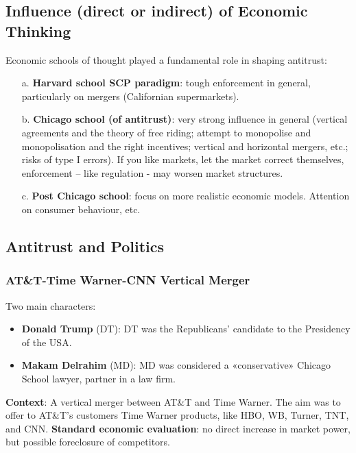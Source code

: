         
    \subsection{Influence (direct or indirect) of Economic Thinking}

        Economic schools of thought played a fundamental role in shaping antitrust: 
        \begin{itemize}
            \item[a.] \textbf{Harvard school SCP paradigm}: tough enforcement in general, particularly on mergers (Californian supermarkets).
            \item[b.] \textbf{Chicago school (of antitrust)}: very strong influence in general (vertical agreements and the theory of free riding;  attempt to monopolise and monopolisation and the right incentives; vertical and horizontal mergers, etc.; risks of type I errors). If you like markets, let the market correct themselves, enforcement – like regulation - may worsen market structures.
            \item[c.] \textbf{Post Chicago school}: focus on more realistic economic models. Attention on consumer behaviour, etc. 
        \end{itemize}


    \subsection{Antitrust and Politics}

        \subsubsection{AT\&T-Time Warner-CNN Vertical Merger}

            Two main characters:
                \begin{itemize}
                    \item \textbf{Donald Trump} (DT): DT was the Republicans’ candidate to the Presidency of the USA.
                    \item \textbf{Makam Delrahim} (MD): MD was considered a «conservative» Chicago School lawyer, partner in a law firm.  
                \end{itemize}

            \textbf{Context}: A vertical merger between AT\&T and Time Warner. The aim was to offer to AT\&T’s customers Time Warner products, like HBO, WB, Turner, TNT, and CNN. 
            \textbf{Standard economic evaluation}: no direct increase in market power, but possible foreclosure of competitors.

